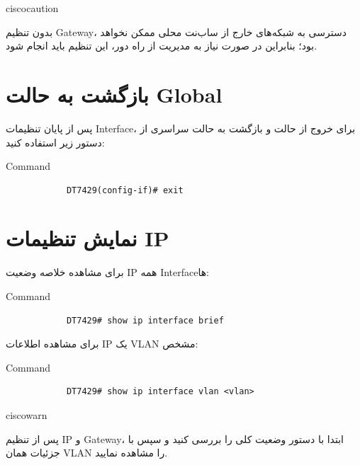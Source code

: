 \documentclass[11pt,letterpaper]{report}
\newenvironment{cautionbox}[1]{%
	\begin{noticebox}[title={\textbf{\faExclamationTriangle\ #1}}]{ciscocaution}
	}{%
	\end{noticebox}
}
\newenvironment{tipbox}[1]{%
	\begin{noticebox}[title={\textbf{\faLightbulb\ #1}}]{ciscowarn}
	}{%
	\end{noticebox}
}
\begin{document}
	\begin{cautionbox}{هشدار}
		بدون تنظیم Gateway، دسترسی به شبکه‌های خارج از ساب‌نت محلی ممکن
		نخواهد بود؛ بنابراین در صورت نیاز به مدیریت از راه دور، این تنظیم
		باید انجام شود.
	\end{cautionbox}


	\section{بازگشت به حالت Global}

	پس از پایان تنظیمات Interface، برای خروج از حالت 
	و بازگشت به حالت سراسری از دستور زیر استفاده کنید:

	\begin{latin}
		\begin{cliexample}{Command}
			\begin{verbatim}
			DT7429(config-if)# exit
			\end{verbatim}
		\end{cliexample}
	\end{latin}


	\section{نمایش تنظیمات IP}

	برای مشاهده خلاصه وضعیت IP همه Interfaceها:

	\begin{latin}
		\begin{cliexample}{Command}
			\begin{verbatim}
			DT7429# show ip interface brief
			\end{verbatim}
		\end{cliexample}
	\end{latin}

	برای مشاهده اطلاعات IP یک VLAN مشخص:

	\begin{latin}
		\begin{cliexample}{Command}
			\begin{verbatim}
			DT7429# show ip interface vlan <vlan>
			\end{verbatim}
		\end{cliexample}
	\end{latin}

	\begin{tipbox}{روش بررسی}
		پس از تنظیم IP و Gateway، ابتدا با دستور
		 وضعیت کلی را بررسی کنید و سپس با
		 جزئیات همان VLAN را مشاهده
		نمایید.
	\end{tipbox}
\end{document}

